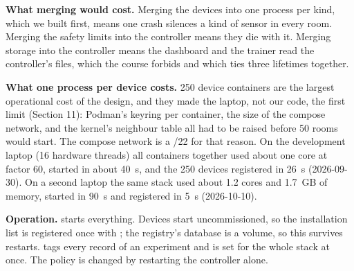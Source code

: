 \textbf{What merging would cost.} Merging the devices into one process per
kind, which we built first, means one crash silences a kind of sensor in every
room. Merging the safety limits into the controller means they die with it.
Merging storage into the controller means the dashboard and the trainer read
the controller's files, which the course forbids and which ties three
lifetimes together.

\textbf{What one process per device costs.} 250 device containers are the
largest operational cost of the design, and they made the laptop, not our
code, the first limit (Section 11): Podman's keyring per container, the size of
the compose network, and the kernel's neighbour table all had to be raised
before 50 rooms would start. The compose network is a /22 for that reason.
On the development laptop (16 hardware threads) all containers together used
about one core at factor 60, started in about 40~s, and the 250 devices
registered in 26~s (2026-09-30). On a second laptop the same stack used about
1.2 cores and 1.7~GB of memory, started in 90~s and registered in 5~s
(2026-10-10).

\textbf{Operation.}  starts everything.
Devices start uncommissioned, so the installation list is registered once with
; the registry's database is a volume, so this survives
restarts.  tags every record of an experiment and is set for the
whole stack at once. The policy is changed by restarting the controller alone.
